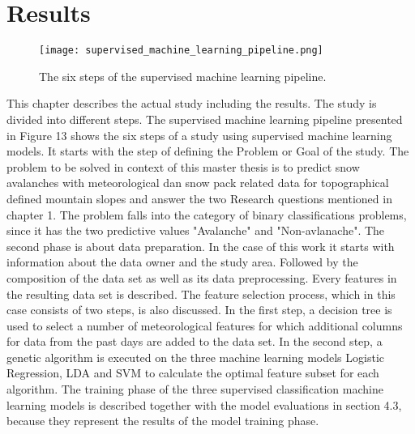 \documentclass[../masterarbeit.tex]{subfiles}
\begin{document}
\section{Results}
\begin{figure}[h]
    \centering
    \texttt{[image: supervised\_machine\_learning\_pipeline.png]}
    \caption{The six steps of the supervised machine learning pipeline.}
    \end{figure} 
This chapter describes the actual study including the results. The study is divided into different steps. The supervised machine learning pipeline presented in Figure 13 shows the six steps of a study using supervised machine learning models. It starts with the step of defining the Problem or Goal of the study. 
The problem to be solved in context of this master thesis is to predict snow avalanches with meteorological dan snow pack related data for topographical defined mountain slopes and answer the two Research questions mentioned in chapter 1. The problem falls into the category of binary classifications problems, since it has the two predictive values "Avalanche" and "Non-avlanache".
The second phase is about data preparation. In the case of this work it starts with information about the data owner and the study area. Followed by the composition of the data set as well as its data preprocessing. Every features in the resulting data set is described. 
The feature selection process, which in this case consists of two steps, is also discussed. In the first step, a decision tree is used to select a number of meteorological features for which additional columns for data from the past days are added to the data set. In the second step, a genetic algorithm is executed on the three machine learning models Logistic Regression, LDA and SVM to calculate the optimal feature subset for each algorithm. 
The training phase of the three supervised classification machine learning models is described together with the model evaluations in section 4.3, because they represent the results of the model training phase.












\clearpage
\newpage

    
  
\clearpage
\newpage

  
\clearpage
\newpage

\end{document}
